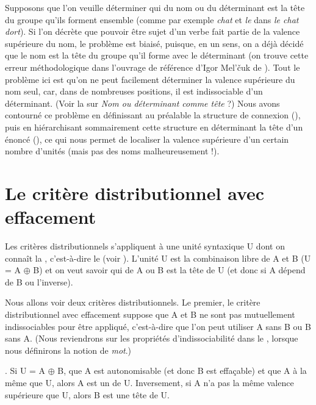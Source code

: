 Supposons que l’on veuille déterminer qui du nom ou du déterminant est la tête du groupe qu’ils forment ensemble (comme par exemple \textit{chat} et \textit{le} dans \textit{le chat dort}). Si l’on décrète que pouvoir être sujet d’un verbe fait partie de la valence supérieure du nom, le problème est biaisé, puisque, en un sens, on a déjà décidé que le nom est la tête du groupe qu’il forme avec le déterminant (on trouve cette erreur méthodologique dans l’ouvrage de référence d’Igor Mel’čuk de \citeyear{melcuk1988dependency}). Tout le problème ici est qu’on ne peut facilement déterminer la valence supérieure du nom seul, car, dans de nombreuses positions, il est indissociable d’un déterminant. (Voir la  sur \textit{Nom ou déterminant comme tête} ?) Nous avons contourné ce problème en définissant au préalable la structure de connexion (), puis en hiérarchisant sommairement cette structure en déterminant la tête d’un énoncé (), ce qui nous permet de localiser la valence supérieure d’un certain nombre d’unités (mais pas des noms malheureusement !).

\section{Le critère distributionnel avec effacement}\label{sec:3.3.11}

Les critères distributionnels s’appliquent à une unité syntaxique U dont on connaît la , c’est-à-dire le  (voir ).
L'unité U est la combinaison libre de A et B (U = A ${\oplus}$ B) et on veut savoir qui de A ou B est la tête de U (et donc si A dépend de B ou l'inverse).

Nous allons voir deux critères distributionnels. Le premier, le critère distributionnel avec effacement suppose que A et B ne sont pas mutuellement indissociables pour être appliqué, c'est-à-dire que l'on peut utiliser A sans B ou B sans A. (Nous reviendrons sur les propriétés d'indissociabilité dans le  , lorsque nous définirons la notion de \textit{mot}.)

{. Si U = A ${\oplus}$ B, que A est autonomisable (et donc B est effaçable) et que A à la même  que U, alors A est un  de U.
Inversement, si A n'a pas la même valence supérieure que U, alors B est une tête de U.}

